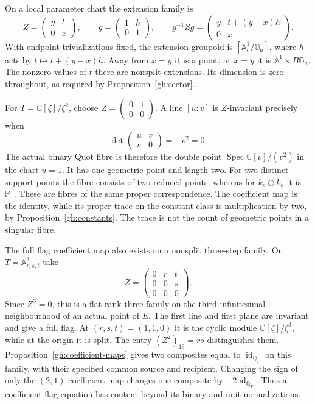 On a local parameter chart the extension family is
\[
 Z=\begin{pmatrix}y&t\\0&x\end{pmatrix},\qquad
 g=\begin{pmatrix}1&h\\0&1\end{pmatrix},\qquad
 g^{-1}Zg=
 \begin{pmatrix}y&t+(y-x)h\\0&x\end{pmatrix}.
\]
With endpoint trivializations fixed, the extension groupoid is
$[\mathbb A^1_t/\mathbb G_a]$, where
$h$ acts by $t\mapsto t+(y-x)h$.
Away from $x=y$ it is a point; at $x=y$ it is
$\mathbb A^1\times B\mathbb G_a$.
The nonzero values of $t$ there are nonsplit extensions.
Its dimension is zero throughout, as required by
Proposition~\ref{gh:sector}.

\begin{example}\label{gh:double-fibre}
For $T=\mathbb C[\zeta]/\zeta^2$, choose
$Z=\left(\begin{smallmatrix}0&1\\0&0\end{smallmatrix}\right)$.
A line $[u:v]$ is $Z$-invariant precisely when
\[
 \det\begin{pmatrix}u&v\\v&0\end{pmatrix}=-v^2=0.
\]
The actual binary Quot fibre is therefore the double point
$\operatorname{Spec}\mathbb C[v]/(v^2)$ in the chart $u=1$.
It has one geometric point and length two.
For two distinct support points the fibre consists of two
reduced points, whereas for $k_e\oplus k_e$ it is
$\mathbb P^1$.
These are fibres of the same proper correspondence.
The coefficient map is the identity, while its proper trace on
the constant class is multiplication by two, by
Proposition~\ref{gh:constants}. The trace is not the count of
geometric points in a singular fibre.
\end{example}

The full flag coefficient map also exists on a nonsplit
three-step family. On $T=\mathbb A^3_{r,s,t}$ take
\[
 Z=\begin{pmatrix}0&r&t\\0&0&s\\0&0&0\end{pmatrix}.
\]
Since $Z^3=0$, this is a flat rank-three family on the third
infinitesimal neighbourhood of an actual point of $E$.
The first line and first plane are invariant and give a full
flag. At $(r,s,t)=(1,1,0)$ it is the cyclic module
$\mathbb C[\zeta]/\zeta^3$, while at the origin it is split.
The entry $(Z^2)_{13}=rs$ distinguishes them.
Proposition~\ref{gh:coefficient-maps} gives two composites equal
to $\operatorname{id}_{\mathbb Q_T}$ on this family, with their
specified common source and recipient. Changing the sign of
only the $(2,1)$ coefficient map changes one composite by
$-2\operatorname{id}_{\mathbb Q_T}$.
Thus a coefficient flag equation has content beyond its binary
and unit normalizations.

